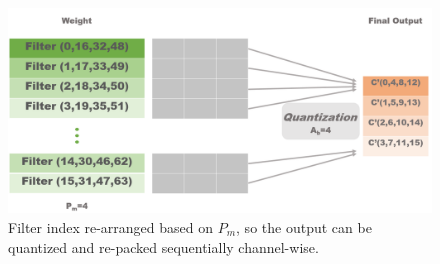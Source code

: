 \begin{figure}[h]
    \centering
    \includegraphics[width=1\linewidth]{inc/4_proposed_architecture/figure/filter_arrange.png}
    \caption{Filter index re-arranged based on $P_m$, so the output can be quantized and re-packed sequentially channel-wise.}
    \label{fig:filter_arrange}
\end{figure}

